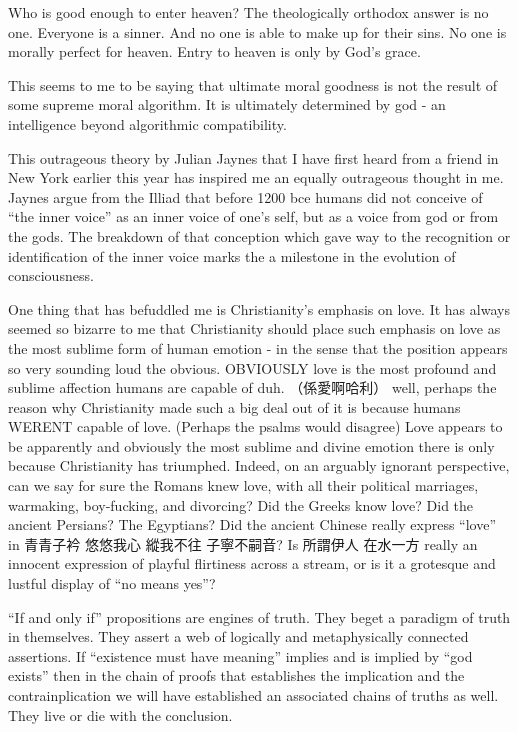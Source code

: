 Who is good enough to enter heaven? The theologically orthodox answer is no one. Everyone is a sinner. And no one is able to make up for their sins. No one is morally perfect for heaven. Entry to heaven is only by God’s grace. 

This seems to me to be saying that ultimate moral goodness is not the result of some supreme moral algorithm. It is ultimately determined by god - an intelligence beyond algorithmic compatibility. 



This outrageous theory by Julian Jaynes that I have first heard from a friend in New York earlier this year has inspired me an equally outrageous thought in me. Jaynes argue from the Illiad that before 1200 bce humans did not conceive of “the inner voice” as an inner voice of one’s self, but as a voice from god or from the gods. The breakdown of that conception which gave way to the recognition or identification of the inner voice marks the a milestone in the evolution of consciousness. 

One thing that has befuddled me is Christianity’s emphasis on love. It has always seemed so bizarre to me that Christianity should place such emphasis on love as the most sublime form of human emotion - in the sense that the position appears so very sounding loud the obvious. OBVIOUSLY love is the most profound and sublime affection humans are capable of duh. （係愛啊哈利） well, perhaps the reason why Christianity made such a big deal out of it is because humans WERENT capable of love. (Perhaps the psalms would disagree) Love appears to be apparently and obviously the most sublime and divine emotion there is only because Christianity has triumphed. Indeed, on an arguably ignorant perspective, can we say for sure the Romans knew love, with all their political marriages, warmaking, boy-fucking, and divorcing? Did the Greeks know love? Did the ancient Persians? The Egyptians? Did the ancient Chinese really express “love” in 青青子衿 悠悠我心 縱我不往 子寧不嗣音? Is 所謂伊人 在水一方 really an innocent expression of playful flirtiness across a stream, or is it a grotesque and lustful display of “no means yes”? 



“If and only if” propositions are engines of truth. They beget a paradigm of truth in themselves. They assert a web of logically and metaphysically connected assertions. If “existence must have meaning” implies and is implied by “god exists” then in the chain of proofs that establishes the implication and the contrainplication we will have established an associated chains of truths as well. They live or die with the conclusion. 

